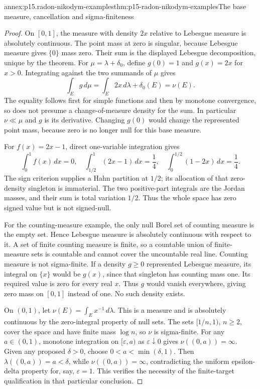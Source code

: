 \begin{annexitem}{annex:p15.radon-nikodym-examples}{thm:p15-radon-nikodym-examples}{The base measure, cancellation and sigma-finiteness}
\begin{proof}
On \([0,1]\), the measure with density \(2x\) relative to Lebesgue
measure is absolutely continuous. The point mass at zero is singular,
because Lebesgue measure gives \(\{0\}\) mass zero.
Their sum is the displayed Lebesgue decomposition, unique by the theorem.
For \(\mu=\lambda+\delta_0\), define \(g(0)=1\) and \(g(x)=2x\)
for \(x>0\). Integrating against the two summands of \(\mu\) gives
\[
                     \int_Eg\,d\mu=\int_E2x\,d\lambda+\delta_0(E)
                                      =\nu(E).
\]
The equality follows first for simple functions and then by monotone
convergence, so does not presume a change-of-measure density for the sum.
In particular \(\nu\ll\mu\) and \(g\) is its derivative.
Changing \(g(0)\) would change the represented point mass, because
zero is no longer null for this base measure.

For \(f(x)=2x-1\), direct one-variable integration gives
\[
 \int_0^1f(x)\,dx=0,\quad
 \int_{1/2}^1(2x-1)\,dx=\frac14,\quad
 \int_0^{1/2}(1-2x)\,dx=\frac14 .
\]
The sign criterion supplies a Hahn partition at \(1/2\);
its allocation of that zero-density singleton is immaterial.
The two positive-part integrals are the Jordan masses, and their sum
is total variation \(1/2\). Thus the whole space has zero signed value
but is not signed-null.

For the counting-measure example, the only null Borel set of counting
measure is the empty set. Hence Lebesgue measure is absolutely
continuous with respect to it.
A set of finite counting measure is finite, so a countable union
of finite-measure sets is countable and cannot cover the uncountable
real line. Counting measure is not sigma-finite.
If a density \(g\geq0\) represented Lebesgue measure, its integral
on \(\{x\}\) would be \(g(x)\), since that singleton has counting
mass one. Its required value is zero for every real \(x\).
Thus \(g\) would vanish everywhere, giving zero mass on \([0,1]\)
instead of one. No such density exists.

On \((0,1)\), let \(\nu(E)=\int_E x^{-1}\,d\lambda\).
This is a measure and is absolutely continuous by the zero-integral
property of null sets. The sets \([1/n,1)\), \(n\geq2\), cover the
space and have finite mass \(\log n\), so \(\nu\) is sigma-finite.
For any \(a\in(0,1)\), monotone integration on \([\varepsilon,a)\)
as \(\varepsilon\downarrow0\) gives
\(\nu((0,a))=\infty\).
Given any proposed \(\delta>0\), choose \(0<a<\min(\delta,1)\).
Then \(\lambda((0,a))=a<\delta\), while \(\nu((0,a))=\infty\),
contradicting the uniform epsilon-delta property for, say,
\(\varepsilon=1\). This verifies the necessity of the finite-target
qualification in that particular conclusion.
\end{proof}
\end{annexitem}
